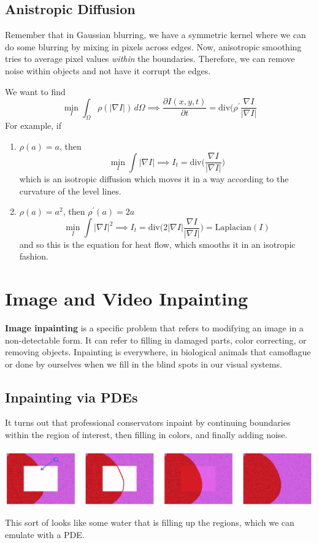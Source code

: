 \documentclass{article}
\begin{document}
  \subsection{Anistropic Diffusion}

    Remember that in Gaussian blurring, we have a symmetric kernel where we can do some blurring by mixing in pixels across edges. Now, anisotropic smoothing tries to average pixel values \textit{within} the boundaries. Therefore, we can remove noise within objects and not have it corrupt the edges. 

    We want to find 
    \[\min_I \int_\Omega \rho(| \nabla I|) \,d \Omega \implies \frac{\partial I(x, y, t)}{\partial t} = \mathrm{div} \bigg( \rho^\prime \frac{\nabla I}{|\nabla I|}\]
    For example, if 
    \begin{enumerate}
        \item $\rho(a) = a$, then 
        \[\min_I \int |\nabla I| \implies I_t = \mathrm{div} \bigg( \frac{\nabla I}{|\nabla I|} \bigg)\]
        which is an isotropic diffusion which moves it in a way according to the curvature of the level lines. 

        \item $\rho(a) = a^2$, then $\rho^\prime(a) = 2a$
        \[\min_I \int |\nabla I|^2 \implies I_t = \mathrm{div} \bigg( 2 |\nabla I| \frac{\nabla I}{|\nabla I|} \bigg) = \text{Laplacian}(I)\]
        and so this is the equation for heat flow, which smooths it in an isotropic fashion. 
    \end{enumerate}

\section{Image and Video Inpainting}

    \textbf{Image inpainting} is a specific problem that refers to modifying an image in a non-detectable form. It can refer to filling in damaged parts, color correcting, or removing objects. Inpainting is everywhere, in biological animals that camoflague or done by ourselves when we fill in the blind spots in our visual systems. 

  \subsection{Inpainting via PDEs}

    It turns out that professional conservators inpaint by continuing boundaries within the region of interest, then filling in colors, and finally adding noise. 
    \begin{center}
        \includegraphics[scale=0.2]{img/inpainting.png}
    \end{center}
    This sort of looks like some water that is filling up the regions, which we can emulate with a PDE.
\end{document}
